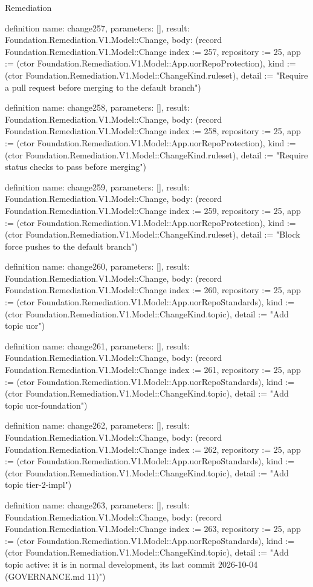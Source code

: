 \begin{lexlean}{Remediation}
\begin{semanticmodule}
definition{
  name: change257,
  parameters: [],
  result: Foundation.Remediation.V1.Model::Change,
  body: (record Foundation.Remediation.V1.Model::Change {index := 257, repository := 25, app := (ctor Foundation.Remediation.V1.Model::App.uorRepoProtection), kind := (ctor Foundation.Remediation.V1.Model::ChangeKind.ruleset), detail := "Require a pull request before merging to the default branch"})
}

definition{
  name: change258,
  parameters: [],
  result: Foundation.Remediation.V1.Model::Change,
  body: (record Foundation.Remediation.V1.Model::Change {index := 258, repository := 25, app := (ctor Foundation.Remediation.V1.Model::App.uorRepoProtection), kind := (ctor Foundation.Remediation.V1.Model::ChangeKind.ruleset), detail := "Require status checks to pass before merging"})
}

definition{
  name: change259,
  parameters: [],
  result: Foundation.Remediation.V1.Model::Change,
  body: (record Foundation.Remediation.V1.Model::Change {index := 259, repository := 25, app := (ctor Foundation.Remediation.V1.Model::App.uorRepoProtection), kind := (ctor Foundation.Remediation.V1.Model::ChangeKind.ruleset), detail := "Block force pushes to the default branch"})
}

definition{
  name: change260,
  parameters: [],
  result: Foundation.Remediation.V1.Model::Change,
  body: (record Foundation.Remediation.V1.Model::Change {index := 260, repository := 25, app := (ctor Foundation.Remediation.V1.Model::App.uorRepoStandards), kind := (ctor Foundation.Remediation.V1.Model::ChangeKind.topic), detail := "Add topic uor"})
}

definition{
  name: change261,
  parameters: [],
  result: Foundation.Remediation.V1.Model::Change,
  body: (record Foundation.Remediation.V1.Model::Change {index := 261, repository := 25, app := (ctor Foundation.Remediation.V1.Model::App.uorRepoStandards), kind := (ctor Foundation.Remediation.V1.Model::ChangeKind.topic), detail := "Add topic uor-foundation"})
}

definition{
  name: change262,
  parameters: [],
  result: Foundation.Remediation.V1.Model::Change,
  body: (record Foundation.Remediation.V1.Model::Change {index := 262, repository := 25, app := (ctor Foundation.Remediation.V1.Model::App.uorRepoStandards), kind := (ctor Foundation.Remediation.V1.Model::ChangeKind.topic), detail := "Add topic tier-2-impl"})
}

definition{
  name: change263,
  parameters: [],
  result: Foundation.Remediation.V1.Model::Change,
  body: (record Foundation.Remediation.V1.Model::Change {index := 263, repository := 25, app := (ctor Foundation.Remediation.V1.Model::App.uorRepoStandards), kind := (ctor Foundation.Remediation.V1.Model::ChangeKind.topic), detail := "Add topic active: it is in normal development, its last commit 2026-10-04 (GOVERNANCE.md 11)"})
}


\end{semanticmodule}
\end{lexlean}
